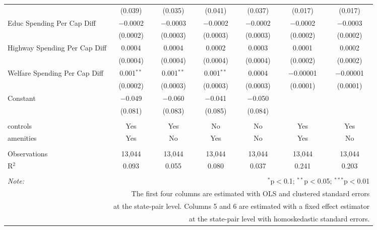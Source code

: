 \begin{table}[!htbp]
\begin{tabular}{@{\extracolsep{5pt}}lcccccc}
  & (0.039) & (0.035) & (0.041) & (0.037) & (0.017) & (0.017) \\ 
  Educ Spending Per Cap Diff & $-$0.0002 & $-$0.0003 & $-$0.0002 & $-$0.0002 & $-$0.0002 & $-$0.0003 \\ 
  & (0.0002) & (0.0003) & (0.0003) & (0.0003) & (0.0002) & (0.0002) \\ 
  Highway Spending Per Cap Diff & 0.0004 & 0.0004 & 0.0002 & 0.0003 & 0.0001 & 0.0002 \\ 
  & (0.0004) & (0.0004) & (0.0004) & (0.0004) & (0.0002) & (0.0002) \\ 
  Welfare Spending Per Cap Diff & 0.001$^{**}$ & 0.001$^{**}$ & 0.001$^{**}$ & 0.0004 & $-$0.00001 & $-$0.00001 \\ 
  & (0.0002) & (0.0003) & (0.0003) & (0.0003) & (0.0001) & (0.0001) \\ 
  Constant & $-$0.049 & $-$0.060 & $-$0.041 & $-$0.050 &  &  \\ 
  & (0.081) & (0.083) & (0.085) & (0.084) &  &  \\ 
 \hline \\[-1.8ex] 
controls & Yes & Yes & No & No & Yes & Yes \\ 
amenities & Yes & No & Yes & No & Yes & No \\ 
\hline \\[-1.8ex] 
Observations & 13,044 & 13,044 & 13,044 & 13,044 & 13,044 & 13,044 \\ 
R$^{2}$ & 0.093 & 0.055 & 0.080 & 0.037 & 0.241 & 0.203 \\ 
\hline 
\hline \\[-1.8ex] 
\textit{Note:}  & \multicolumn{6}{r}{$^{*}$p$<$0.1; $^{**}$p$<$0.05; $^{***}$p$<$0.01} \\ 
 & \multicolumn{6}{r}{The first four columns are estimated with OLS and clustered standard errors} \\ 
 & \multicolumn{6}{r}{at the state-pair level. Columns 5 and 6 are estimated with a fixed effect estimator} \\ 
 & \multicolumn{6}{r}{at the state-pair level with homoskedastic standard errors.} \\ 
\end{tabular} 
\end{table} 
